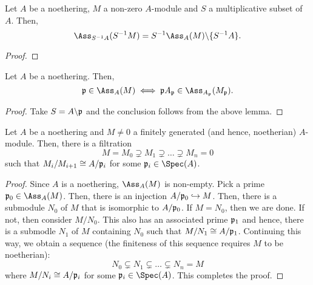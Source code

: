 \begin{lemma}
    Let $A$ be a noethering, $M$ a non-zero $A$-module and $S$ a multiplicative subset of $A$. Then, 
    \begin{equation*}
        \Ass_{S^{-1}A}(S^{-1}M) = S^{-1}\Ass_A(M)\backslash\{S^{-1}A\}.
    \end{equation*}
\end{lemma}
\begin{proof}
\end{proof}

\begin{corollary}
    Let $A$ be a noethering. Then, 
    \begin{equation*}
        \frakp\in\Ass_A(M)\iff \frakp A_\frakp\in\Ass_{A_\frakp}(M_\frakp).
    \end{equation*}
\end{corollary}
\begin{proof}
    Take $S = A\backslash\mathfrak p$ and the conclusion follows from the above lemma.
\end{proof}

\begin{proposition}
    Let $A$ be a noethering and $M\ne 0$ a finitely generated (and hence, noetherian) $A$-module. Then, there is a filtration 
    \begin{equation*}
        M = M_0\supsetneq M_1\supsetneq\dots\supsetneq M_n = 0
    \end{equation*}
    such that $M_i/M_{i + 1}\cong A/\mathfrak p_i$ for some $\frakp_i\in\Spec(A)$.
\end{proposition}
\begin{proof}
    Since $A$ is a noethering, $\Ass_A(M)$ is non-empty. Pick a prime $\frakp_0\in\Ass_A(M)$. Then, there is an injection $A/\mathfrak p_0\hookrightarrow M$. Then, there is a submodule $N_0$ of $M$ that is isomorphic to $A/\mathfrak p_0$. If $M = N_0$, then we are done. If not, then consider $M/N_0$. This also has an associated prime $\mathfrak p_1$ and hence, there is a submodle $N_1$ of $M$ containing $N_0$ such that $M/N_1\cong A/\mathfrak p_1$. Continuing this way, we obtain a sequence (the finiteness of this sequence requires $M$ to be noetherian):
    \begin{equation*}
        N_0\subsetneq N_1\subsetneq\dots\subsetneq N_n = M
    \end{equation*}
    where $M/N_i\cong A/\mathfrak p_i$ for some $\frakp_i\in\Spec(A)$. This completes the proof.
\end{proof}

